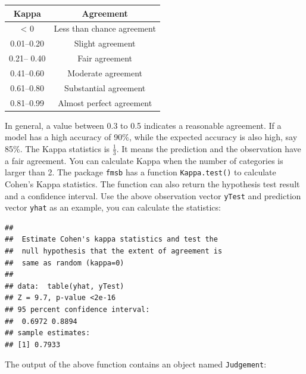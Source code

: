 \documentclass[
  12pt,
]{krantz}
\makeatletter
\newenvironment{Shaded}{\begin{snugshade}}{\end{snugshade}}
\newcommand{\CommentTok}[1]{\textcolor[rgb]{0.37,0.37,0.37}{\textit{#1}}}
\newcommand{\FunctionTok}[1]{\textcolor[rgb]{0,0,0}{#1}}
\newcommand{\NormalTok}[1]{#1}
\newcommand{\OtherTok}[1]{\textcolor[rgb]{0.37,0.37,0.37}{#1}}
\newcommand{\SpecialCharTok}[1]{\textcolor[rgb]{0,0,0}{#1}}
\newenvironment{kframe}{%
\medskip{}
\setlength{\fboxsep}{.8em}
 \def\at@end@of@kframe{}%
 \ifinner\ifhmode%
  \def\at@end@of@kframe{\end{minipage}}%
  \begin{minipage}{\columnwidth}%
 \fi\fi%
 \def\FrameCommand##1{\hskip\@totalleftmargin \hskip-\fboxsep
 \colorbox{shadecolor}{##1}\hskip-\fboxsep
     \hskip-\linewidth \hskip-\@totalleftmargin \hskip\columnwidth}%
 \MakeFramed {\advance\hsize-\width
   \@totalleftmargin\z@ \linewidth\hsize
   \@setminipage}}%
 {\par\unskip\endMakeFramed%
 \at@end@of@kframe}
\renewenvironment{Shaded}{\begin{kframe}}{\end{kframe}}
\makeatother
\begin{document}
\begin{longtable}[]{@{}cc@{}}
\toprule
Kappa & Agreement \\
\midrule
\endhead
\textless{} 0 & Less than chance agreement \\
0.01--0.20 & Slight agreement \\
0.21-- 0.40 & Fair agreement \\
0.41--0.60 & Moderate agreement \\
0.61--0.80 & Substantial agreement \\
0.81--0.99 & Almost perfect agreement \\
\bottomrule
\end{longtable}

In general, a value between 0.3 to 0.5 indicates a reasonable agreement. If a model has a high accuracy of 90\%, while the expected accuracy is also high, say 85\%. The Kappa statistics is \(\frac{1}{3}\). It means the prediction and the observation have a fair agreement. You can calculate Kappa when the number of categories is larger than 2. The package \texttt{fmsb} has a function \texttt{Kappa.test()} to calculate Cohen's Kappa statistics. The function can also return the hypothesis test result and a confidence interval. Use the above observation vector \texttt{yTest} and prediction vector \texttt{yhat} as an example, you can calculate the statistics:

\begin{Shaded}
\end{Shaded}

\begin{verbatim}
## 
##  Estimate Cohen's kappa statistics and test the
##  null hypothesis that the extent of agreement is
##  same as random (kappa=0)
## 
## data:  table(yhat, yTest)
## Z = 9.7, p-value <2e-16
## 95 percent confidence interval:
##  0.6972 0.8894
## sample estimates:
## [1] 0.7933
\end{verbatim}

The output of the above function contains an object named \texttt{Judgement}:

\begin{Shaded}
\end{Shaded}
\end{document}
